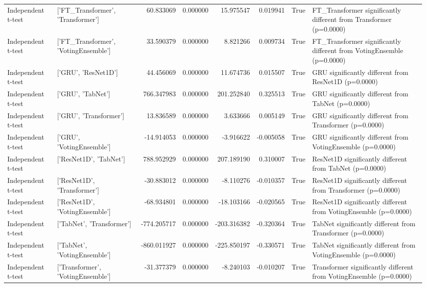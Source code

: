 \begin{table}
\begin{tabular}{llrrrrrl}
Independent t-test & ['FT_Transformer', 'Transformer'] & 60.833069 & 0.000000 & 15.975547 & 0.019941 & True & FT_Transformer significantly different from Transformer (p=0.0000) \\
Independent t-test & ['FT_Transformer', 'VotingEnsemble'] & 33.590379 & 0.000000 & 8.821266 & 0.009734 & True & FT_Transformer significantly different from VotingEnsemble (p=0.0000) \\
Independent t-test & ['GRU', 'ResNet1D'] & 44.456069 & 0.000000 & 11.674736 & 0.015507 & True & GRU significantly different from ResNet1D (p=0.0000) \\
Independent t-test & ['GRU', 'TabNet'] & 766.347983 & 0.000000 & 201.252840 & 0.325513 & True & GRU significantly different from TabNet (p=0.0000) \\
Independent t-test & ['GRU', 'Transformer'] & 13.836589 & 0.000000 & 3.633666 & 0.005149 & True & GRU significantly different from Transformer (p=0.0000) \\
Independent t-test & ['GRU', 'VotingEnsemble'] & -14.914053 & 0.000000 & -3.916622 & -0.005058 & True & GRU significantly different from VotingEnsemble (p=0.0000) \\
Independent t-test & ['ResNet1D', 'TabNet'] & 788.952929 & 0.000000 & 207.189190 & 0.310007 & True & ResNet1D significantly different from TabNet (p=0.0000) \\
Independent t-test & ['ResNet1D', 'Transformer'] & -30.883012 & 0.000000 & -8.110276 & -0.010357 & True & ResNet1D significantly different from Transformer (p=0.0000) \\
Independent t-test & ['ResNet1D', 'VotingEnsemble'] & -68.934801 & 0.000000 & -18.103166 & -0.020565 & True & ResNet1D significantly different from VotingEnsemble (p=0.0000) \\
Independent t-test & ['TabNet', 'Transformer'] & -774.205717 & 0.000000 & -203.316382 & -0.320364 & True & TabNet significantly different from Transformer (p=0.0000) \\
Independent t-test & ['TabNet', 'VotingEnsemble'] & -860.011927 & 0.000000 & -225.850197 & -0.330571 & True & TabNet significantly different from VotingEnsemble (p=0.0000) \\
Independent t-test & ['Transformer', 'VotingEnsemble'] & -31.377379 & 0.000000 & -8.240103 & -0.010207 & True & Transformer significantly different from VotingEnsemble (p=0.0000) \\
\bottomrule
\end{tabular}
\end{table}

